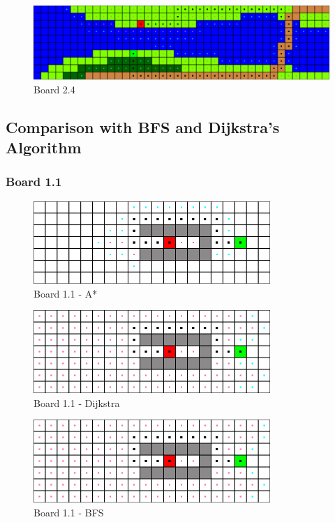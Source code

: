 \begin{figure}[h!]
  \centering
    \includegraphics[width=\textwidth]{img/board-2-4-astar}
    \caption{Board 2.4}
\end{figure}

\clearpage

\subsection*{Comparison with BFS and Dijkstra's Algorithm}

\subsubsection*{Board 1.1}

\begin{figure}[h!]
  \centering
    \includegraphics[width=0.8\textwidth]{img/board-1-1-astar}
    \caption{Board 1.1 - A*}
\end{figure}

\begin{figure}[h!]
  \centering
    \includegraphics[width=0.8\textwidth]{img/board-1-1-dijkstra}
    \caption{Board 1.1 - Dijkstra}
\end{figure}

\begin{figure}[h!]
  \centering
    \includegraphics[width=0.8\textwidth]{img/board-1-1-bfs}
    \caption{Board 1.1 - BFS}
\end{figure}

